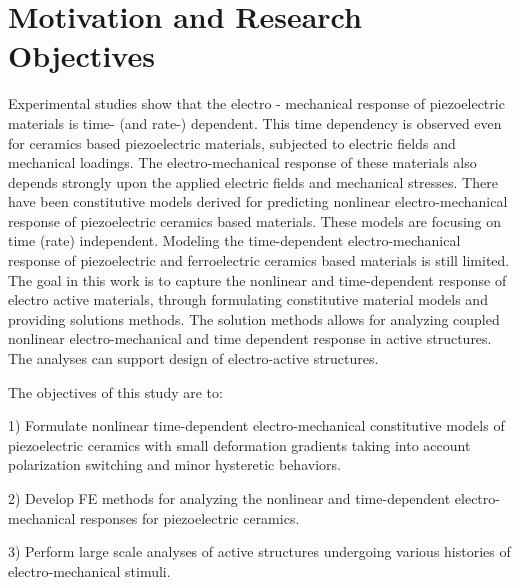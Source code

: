 \section{Motivation and Research Objectives} 
Experimental studies show that the electro - mechanical response of piezoelectric materials is time- (and rate-) dependent.
This time dependency is observed even for ceramics based piezoelectric materials, 
subjected to electric fields and mechanical loadings. 
The electro-mechanical response of these materials also depends strongly upon the applied electric fields and mechanical stresses. 
There have been constitutive models derived for predicting nonlinear electro-mechanical response of piezoelectric ceramics based materials.
These models are focusing on time (rate) independent.
Modeling the time-dependent electro-mechanical response of piezoelectric and ferroelectric ceramics based materials is still limited. 
The goal in this work is to capture the nonlinear and time-dependent response of electro active materials, 
through formulating constitutive material models and providing solutions methods.
The solution methods allows for analyzing coupled nonlinear electro-mechanical and time dependent response in active structures.
The analyses can support design of electro-active structures.

The objectives of this study are to:

1)	Formulate nonlinear time-dependent electro-mechanical constitutive models of piezoelectric ceramics with small deformation gradients taking into account polarization switching and minor hysteretic behaviors.

2)	Develop FE methods for analyzing the nonlinear and time-dependent electro-mechanical responses for piezoelectric ceramics.

3)	Perform large scale analyses of active structures undergoing various histories of electro-mechanical stimuli. 
